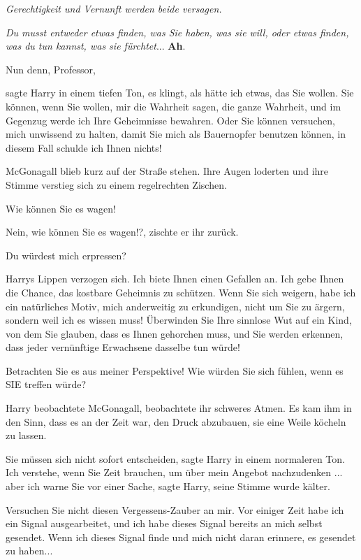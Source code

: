\emph{Gerechtigkeit und Vernunft werden beide versagen.}

\emph{Du musst entweder etwas finden, was Sie haben, was sie will, oder etwas
finden, was du tun kannst, was sie fürchtet}... \textbf{Ah}.

\glqq{}Nun denn, Professor\grqq{},

sagte Harry in einem tiefen Ton, \glqq{}es klingt, als hätte ich etwas, das Sie
wollen. Sie können, wenn Sie wollen, mir die Wahrheit sagen, die ganze Wahrheit,
und im Gegenzug werde ich Ihre Geheimnisse bewahren. Oder Sie können versuchen,
mich unwissend zu halten, damit Sie mich als Bauernopfer benutzen können, in
diesem Fall schulde ich Ihnen nichts!\grqq{}

McGonagall blieb kurz auf der Straße stehen. Ihre Augen loderten und ihre Stimme
verstieg sich zu einem regelrechten Zischen.

\glqq{}Wie können Sie es wagen!\grqq{}

\glqq{}Nein, wie können Sie es wagen!?\grqq{}, zischte er ihr zurück.

\glqq{}Du würdest mich erpressen?\grqq{}

Harrys Lippen verzogen sich. \glqq{}Ich biete Ihnen einen Gefallen an. Ich gebe
Ihnen die Chance, das kostbare Geheimnis zu schützen. Wenn Sie sich weigern,
habe ich ein natürliches Motiv, mich anderweitig zu erkundigen, nicht um Sie zu
ärgern, sondern weil ich es wissen muss! Überwinden Sie Ihre sinnlose Wut auf
ein Kind, von dem Sie glauben, dass es Ihnen gehorchen muss, und Sie werden
erkennen, dass jeder vernünftige Erwachsene dasselbe tun würde!

Betrachten Sie es aus meiner Perspektive! Wie würden Sie sich fühlen, wenn es
SIE treffen würde?\grqq{}

Harry beobachtete McGonagall, beobachtete ihr schweres Atmen. Es kam ihm in den
Sinn, dass es an der Zeit war, den Druck abzubauen, sie eine Weile köcheln zu
lassen.

\glqq{}Sie müssen sich nicht sofort entscheiden\grqq{}, sagte Harry in einem
normaleren Ton. \glqq{}Ich verstehe, wenn Sie Zeit brauchen, um über mein Angebot
nachzudenken ... aber ich warne Sie vor einer Sache\grqq{}, sagte Harry, seine
Stimme wurde kälter.

\glqq{}Versuchen Sie nicht diesen Vergessens-Zauber an mir. Vor einiger Zeit habe
ich ein Signal ausgearbeitet, und ich habe dieses Signal bereits an mich selbst
gesendet. Wenn ich dieses Signal finde und mich nicht daran erinnere, es
gesendet zu haben...\grqq{}

